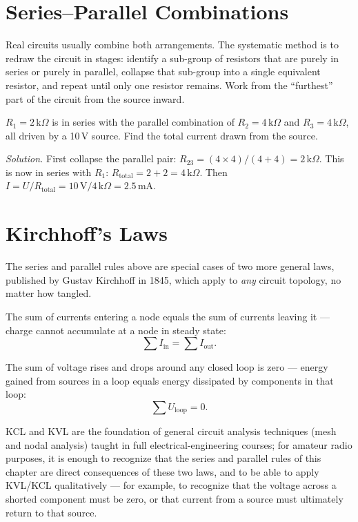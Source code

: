 \section{Series--Parallel Combinations}

Real circuits usually combine both arrangements. The systematic method is
to redraw the circuit in stages: identify a sub-group of resistors that
are purely in series or purely in parallel, collapse that sub-group into
a single equivalent resistor, and repeat until only one resistor remains.
Work from the ``furthest'' part of the circuit from the source inward.

\begin{examplebox}
$R_1 = 2\,\text{k}\Omega$ is in series with the parallel combination of
$R_2 = 4\,\text{k}\Omega$ and $R_3 = 4\,\text{k}\Omega$, all driven by a
10\,V source. Find the total current drawn from the source.

\emph{Solution.} First collapse the parallel pair:
$R_{23} = (4\times4)/(4+4) = 2\,\text{k}\Omega$. This is now in series
with $R_1$: $R_{\text{total}} = 2 + 2 = 4\,\text{k}\Omega$. Then
$I = U/R_{\text{total}} = 10\,\text{V}/4\,\text{k}\Omega = 2.5\,\text{mA}$.
\end{examplebox}

\section{Kirchhoff's Laws}

The series and parallel rules above are special cases of two more general
laws, published by Gustav Kirchhoff in 1845, which apply to \emph{any}
circuit topology, no matter how tangled.

\begin{keyidea}
The sum of currents entering a node equals the sum of currents leaving it
--- charge cannot accumulate at a node in steady state:
\[
\sum I_{\text{in}} = \sum I_{\text{out}}.
\]
\end{keyidea}

\begin{keyidea}
The sum of voltage rises and drops around any closed loop is zero ---
energy gained from sources in a loop equals energy dissipated by
components in that loop:
\[
\sum U_{\text{loop}} = 0.
\]
\end{keyidea}

KCL and KVL are the foundation of general circuit analysis techniques
(mesh and nodal analysis) taught in full electrical-engineering courses;
for amateur radio purposes, it is enough to recognize that the series and
parallel rules of this chapter are direct consequences of these two laws,
and to be able to apply KVL/KCL qualitatively --- for example, to
recognize that the voltage across a shorted component must be zero, or
that current from a source must ultimately return to that source.

